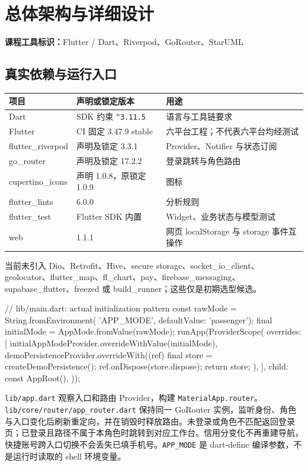 \documentclass[UTF8,fontset=fandol,zihao=-4,oneside]{ctexrep}
\newcommand{\pathcode}[1]{\nolinkurl{#1}}
\newcommand{\toolmark}[1]{\par\noindent\textbf{课程工具标识：}#1\par}
\begin{document}
\chapter{总体架构与详细设计}
\toolmark{Flutter / Dart、Riverpod、GoRouter、StarUML}
\section{真实依赖与运行入口}
\begin{longtable}{p{4.5cm}p{3.5cm}p{6.7cm}}
\toprule 项目 & 声明或锁定版本 & 用途 \\ \midrule
Dart & SDK 约束 \texttt{\^{}3.11.5} & 语言与工具链要求 \\
Flutter & CI 固定 3.47.9 stable & 六平台工程；不代表六平台均经测试 \\
flutter\_riverpod & 声明及锁定 3.3.1 & Provider、Notifier 与状态订阅 \\
go\_router & 声明及锁定 17.2.2 & 登录跳转与角色路由 \\
cupertino\_icons & 声明 1.0.8，原锁定 1.0.9 & 图标 \\
flutter\_lints & 6.0.0 & 分析规则 \\
flutter\_test & Flutter SDK 内置 & Widget、业务状态与模型测试 \\
web & 1.1.1 & 网页 localStorage 与 storage 事件互操作 \\
\bottomrule
\end{longtable}
当前未引入 Dio、Retrofit、Hive、secure storage、socket\_io\_client、geolocator、flutter\_map、fl\_chart、pay、firebase\_messaging、supabase\_flutter、freezed 或 build\_runner；这些仅是初期选型候选。

\begin{code}
// lib/main.dart: actual initialization pattern
const rawMode = String.fromEnvironment(
  'APP_MODE', defaultValue: 'passenger');
final initialMode = AppMode.fromValue(rawMode);
runApp(ProviderScope(
  overrides: [
    initialAppModeProvider.overrideWithValue(initialMode),
    demoPersistenceProvider.overrideWith((ref) {
      final store = createDemoPersistence();
      ref.onDispose(store.dispose);
      return store;
    }),
  ],
  child: const AppRoot(),
));
\end{code}
\pathcode{lib/app.dart} 观察入口和路由 Provider，构建 \texttt{MaterialApp.router}。\pathcode{lib/core/router/app_router.dart} 保持同一 GoRouter 实例，监听身份、角色与入口变化后刷新重定向，并在销毁时释放路由。未登录或角色不匹配返回登录页；已登录且路径不属于本角色时跳转到对应工作台。信用分变化不再重建导航，快捷账号跨入口切换不会丢失已填手机号。\texttt{APP\_MODE} 是 dart-define 编译参数，不是运行时读取的 shell 环境变量。
\end{document}
